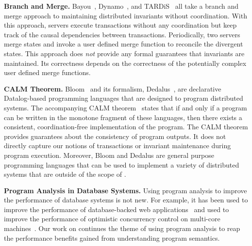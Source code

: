 \textbf{Branch and Merge.}
Bayou~\cite{terry1995managing}, Dynamo~\cite{decandia2007dynamo}, and
TARDiS~\cite{crooks2016tardis} all take a branch and merge approach to
maintaining distributed invariants without coordination. With this approach,
servers execute transactions without any coordination but keep track of the
causal dependencies between transactions. Periodically, two servers merge
states and invoke a user defined merge function to reconcile the divergent
states. This approach does \emph{not} provide any formal guarantees that
invariants are maintained. Its correctness depends on the correctness of the
potentially complex user defined merge functions.


\textbf{CALM Theorem.}
Bloom~\cite{alvaro2010boom, alvaro2011consistency, conway2012logic} and its
formalism, Dedalus~\cite{alvaro2011dedalus, alvaro2013declarative}, are
declarative Datalog-based programming languages that are designed to program
distributed systems. The accompanying CALM
theorem~\cite{hellerstein2010declarative, ameloot2013relational} states that if
and only if a program can be written in the monotone fragment of these
languages, then there exists a consistent, coordination-free implementation of
the program.  The CALM theorem provides guarantees about the consistency of
program outputs. It does not directly capture our notions of transactions or
invariant maintenance during program execution.  Moreover, Bloom and Dedalus
are general purpose programming languages that can be used to implement a
variety of distributed systems that are outside of the scope of
\invariantconfluence{}.

\textbf{Program Analysis in Database Systems.}
Using program analysis to improve the performance of database systems is not
new. For example, it has been used to improve the performance of
database-backed web applications~\cite{cheung2014using, wu2016transaction,
ramachandra2012program} and used to improve the performance of optimistic
concurrency control on multi-core machines~\cite{wu2016transaction}. Our work
on \invariantconfluence{} continues the theme of using program analysis to reap
the performance benefits gained from understanding program semantics.
